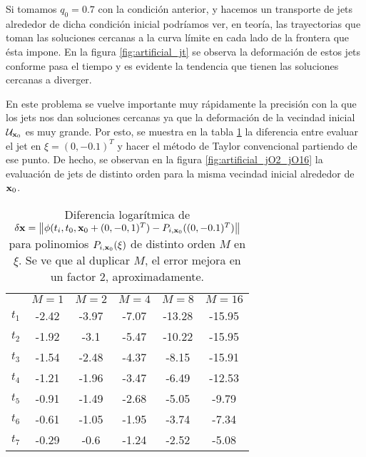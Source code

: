 Si tomamos $q_0 = 0.7$ con la condición anterior, y hacemos un transporte de jets alrededor de dicha condición inicial podríamos ver, en teoría, las trayectorias que toman las soluciones cercanas a la curva límite en cada lado de la frontera que ésta impone. En la figura \ref{fig:artificial_jt} se observa la deformación de estos jets conforme pasa el tiempo y es evidente la tendencia que tienen las soluciones cercanas a diverger.

En este problema se vuelve importante muy rápidamente la precisión con la que los jets nos dan soluciones cercanas ya que la deformación de la vecindad inicial $\mathcal{U}_{\mathbf{x}_0}$ es muy grande. Por esto, se muestra en la tabla \ref{table:djet_artificial} la diferencia entre evaluar el jet en $\xi = (0,-0.1)^T$ y hacer el método de Taylor convencional partiendo de ese punto. De hecho, se observan en la figura \ref{fig:artificial_jO2_jO16} la evaluación de jets de distinto orden para la misma vecindad inicial alrededor de $\mathbf{x}_0$.

\begin{table}[h!]
\centering
\begin{tabular}{c|ccccc}
\toprule
               & \textbf{$ M = 1 $} & \textbf{$M = 2 $} & \textbf{$ M = 4$} & \textbf{$ M = 8 $} & \textbf{$ M = 16 $} \\ \cmidrule(l){1-6} 
\textbf{$t_1$} & -2.42                      & -3.97                      & -7.07                      & -13.28                     & -15.95                        \\
\textbf{$t_2$} & -1.92                      & -3.1                       & -5.47                      & -10.22                     & -15.95                        \\
\textbf{$t_3$} & -1.54                      & -2.48                      & -4.37                      & -8.15                      & -15.91                        \\
\textbf{$t_4$} & -1.21                      & -1.96                      & -3.47                      & -6.49                      & -12.53                        \\
\textbf{$t_5$} & -0.91                      & -1.49                      & -2.68                      & -5.05                      & -9.79                         \\
\textbf{$t_6$} & -0.61                      & -1.05                      & -1.95                      & -3.74                      & -7.34                         \\
\textbf{$t_7$} & -0.29                      & -0.6                       & -1.24                      & -2.52                      & -5.08                         \\ \bottomrule 
\end{tabular}
\caption{Diferencia logarítmica de $\delta \mathbf{x} = \left\lVert \phi(t_i,t_0,\mathbf{x}_0 + (0,-0,1)^T) - P_{i,\mathbf{x}_0}((0,-0.1)^T) \right\rVert$ para polinomios $P_{i,\mathbf{x}_0}(\xi)$ de distinto orden $M$ en $\xi$. Se ve que al duplicar $M$, el error mejora en un factor $2$, aproximadamente.}
\label{table:djet_artificial}
\end{table}

